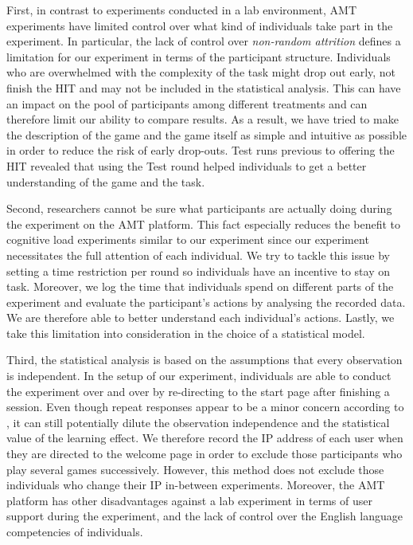First, in contrast to experiments conducted in a lab environment, \ac{AMT} experiments have limited control over what kind of individuals take part in the experiment. In particular, the lack of control over \textit{non-random attrition} \citep{Rand2012} defines a limitation for our experiment in terms of the participant structure. Individuals who are overwhelmed with the complexity of the task might drop out early, not finish the \ac{HIT} and may not be included in the statistical analysis. This can have an impact on the pool of participants among different treatments and can therefore limit our ability to compare results. As a result, we have tried to make the description of the game and the game itself as simple and intuitive as possible in order to reduce the risk of early drop-outs. Test runs previous to offering the \ac{HIT} revealed that using the Test round helped individuals to get a better understanding of the game and the task.

Second, researchers cannot be sure what participants are actually doing during the experiment on the \ac{AMT} platform. This fact especially reduces the benefit to cognitive load experiments similar to our experiment since our experiment necessitates the full attention of each individual. We try to tackle this issue by setting a time restriction per round so individuals have an incentive to stay on task. Moreover, we log the time that individuals spend on different parts of the experiment and evaluate the participant's actions by analysing the recorded data. We are therefore able to better understand each individual's actions. Lastly, we take this limitation into consideration in the choice of a statistical model.

Third, the statistical analysis is based on the assumptions that every observation is independent. In the setup of our experiment, individuals are able to conduct the experiment over and over by re-directing to the start page after finishing a session. Even though repeat responses appear to be a minor concern according to \cite{Berinsky2012}, it can still potentially dilute the observation independence and the statistical value of the learning effect. We therefore record the IP address of each user when they are directed to the welcome page in order to exclude those participants who play several games successively. However, this method does not exclude those individuals who change their IP in-between experiments.
Moreover, the \ac{AMT} platform has other disadvantages against a lab experiment in terms of user support during the experiment, and the lack of control over the English language competencies of individuals. 

